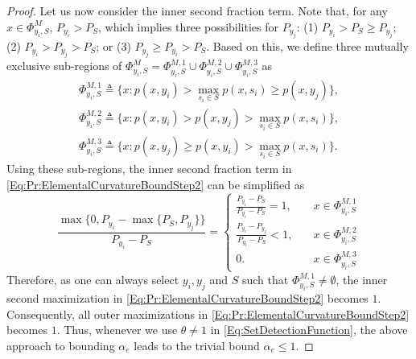 \documentclass[letterpaper, 10 pt, conference]{ieeeconf}
\begin{document}
\begin{proof}
Let us now consider the inner second fraction term. Note that, for any $x\in \Phi_{y_i,S}^M$, $P_{y_i}>P_S$, which implies three possibilities for $P_{y_j}$: 
(1) $P_{y_i}>P_S \geq P_{y_j}$;
(2) $P_{y_i} > P_{y_j} >P_S$; or 
(3) $P_{y_j} \geq P_{y_i} >P_S$. Based on this, we  define three mutually exclusive sub-regions of $\Phi_{y_i,S}^M = \Phi_{y_i,S}^{M,1} \cup \Phi_{y_i,S}^{M,2} \cup \Phi_{y_i,S}^{M,3}$ as 
\begin{equation*}
\begin{aligned}
\Phi_{y_i,S}^{M,1} \triangleq \{x:p(x,y_i) > \max_{s_i\in S}p(x,s_i) \geq p(x,y_j)\},\\
\Phi_{y_i,S}^{M,2} \triangleq \{x:p(x,y_i) > p(x,y_j) > \max_{s_i\in S}p(x,s_i)\},\\
\Phi_{y_i,S}^{M,3} \triangleq \{x:p(x,y_j) \geq p(x,y_i) > \max_{s_i\in S}p(x,s_i)\}.
\end{aligned}    
\end{equation*}
Using these sub-regions, the inner second fraction term in \eqref{Eq:Pr:ElementalCurvatureBoundStep2} can be simplified as  
\begin{equation*}
\frac{\max\{0,P_{y_i}-\max\{P_S,P_{y_j}\}\}}
{P_{y_i}-P_S} = 
\begin{cases}
    \frac{P_{y_i}-P_S}{P_{y_i}-P_S}=1,\quad &x \in \Phi_{y_i,S}^{M,1}\\
    \frac{P_{y_i}-P_{y_j}}{P_{y_i}-P_S}<1,\quad &x \in \Phi_{y_i,S}^{M,2}\\
    0.\quad  &x \in \Phi_{y_i,S}^{M,3}
\end{cases}
\end{equation*}
Therefore, as one can always select $y_i, y_j$ and $S$ such that $\Phi_{y_i,S}^{M,1} \neq \emptyset$, the inner second maximization in \eqref{Eq:Pr:ElementalCurvatureBoundStep2} becomes $1$. Consequently, all outer maximizations in \eqref{Eq:Pr:ElementalCurvatureBoundStep2} becomes $1$. Thus, whenever we use $\theta \neq 1$ in \eqref{Eq:SetDetectionFunction}, the above approach to bounding $\alpha_e$ leads to the trivial bound $\alpha_e \leq 1$. 


\end{proof}
\end{document}
